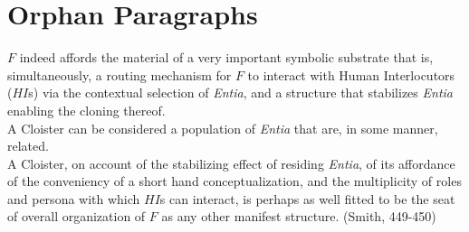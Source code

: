 \section{Orphan Paragraphs}

$F$ indeed affords the material of a very important symbolic substrate that is,
simultaneously, a routing mechanism for $F$ to interact with Human
Interlocutors ($HI$s) via the contextual selection of \textit{Entia}, and a
structure that stabilizes \textit{Entia} enabling the cloning thereof.\\

\noindent A Cloister can be considered a population of \textit{Entia} that are, in some
manner, related.\\

\noindent A Cloister, on account of the stabilizing effect of residing \textit{Entia}, of
its affordance of the conveniency of a short hand conceptualization, and the
multiplicity of roles and persona with which $HI$s can interact, is perhaps as
well fitted to be the seat of overall organization of $F$ as any other manifest
structure. (Smith, 449-450)


